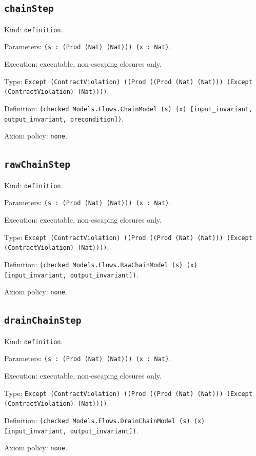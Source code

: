 \documentclass[11pt]{article}
\begin{document}
\subsection*{\texttt{chainStep}}
\noindent Kind: \texttt{definition}.\par
\noindent Parameters: \texttt{(s : (Prod (Nat) (Nat))) (x : Nat)}.\par
\noindent Execution: executable, non-escaping closures only.\par
\noindent Type: \texttt{Except (ContractViolation) ((Prod ((Prod (Nat) (Nat))) (Except (ContractViolation) (Nat))))}.\par
\noindent Definition: \texttt{(checked Models.Flows.ChainModel (s) (x) [input\_invariant, output\_invariant, precondition])}.\par
\noindent Axiom policy: \texttt{none}.\par
\subsection*{\texttt{rawChainStep}}
\noindent Kind: \texttt{definition}.\par
\noindent Parameters: \texttt{(s : (Prod (Nat) (Nat))) (x : Nat)}.\par
\noindent Execution: executable, non-escaping closures only.\par
\noindent Type: \texttt{Except (ContractViolation) ((Prod ((Prod (Nat) (Nat))) (Except (ContractViolation) (Nat))))}.\par
\noindent Definition: \texttt{(checked Models.Flows.RawChainModel (s) (x) [input\_invariant, output\_invariant])}.\par
\noindent Axiom policy: \texttt{none}.\par
\subsection*{\texttt{drainChainStep}}
\noindent Kind: \texttt{definition}.\par
\noindent Parameters: \texttt{(s : (Prod (Nat) (Nat))) (x : Nat)}.\par
\noindent Execution: executable, non-escaping closures only.\par
\noindent Type: \texttt{Except (ContractViolation) ((Prod ((Prod (Nat) (Nat))) (Except (ContractViolation) (Nat))))}.\par
\noindent Definition: \texttt{(checked Models.Flows.DrainChainModel (s) (x) [input\_invariant, output\_invariant])}.\par
\noindent Axiom policy: \texttt{none}.\par
\end{document}
